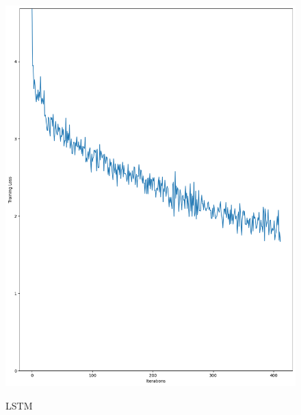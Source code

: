 \documentclass{article}
\begin{document}
\begin{figure}[htbp]
\begin{minipage}[t]{0.19\textwidth}
        \includegraphics[width=\textwidth]{img/LSTM_learning.png} \\
        \caption{LSTM}
        \label{fig:lstm}
    \end{minipage}
    \hfill
    \begin{minipage}[t]{0.19\textwidth}
        \centering

\end{minipage}
\end{figure}
\end{document}
